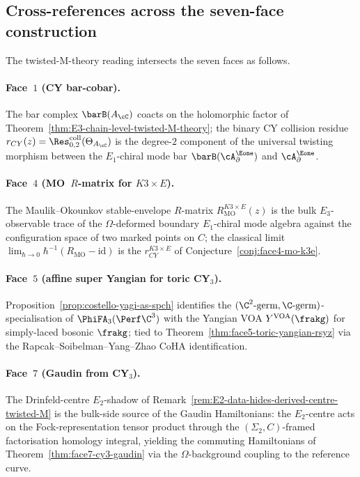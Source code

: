 \subsection{Cross-references across the seven-face construction}
\label{subsec:twisted-M-theory-seven-face-xref}

The twisted-M-theory reading intersects the seven faces as follows.

\paragraph{Face~$1$ (CY bar-cobar).} The bar complex $\barB(A_\cC)$
coacts on the holomorphic factor of
Theorem~\ref{thm:E3-chain-level-twisted-M-theory}; the binary CY
collision residue $r_{CY}(z) = \Res^{\mathrm{coll}}_{0,2}(\Theta_{A_\cC})$
is the degree-$2$ component of the universal twisting morphism between
the $E_1$-chiral mode bar $\barB(\cA^{\Eone}_\partial)$ and
$\cA^{\Eone}_\partial$.

\paragraph{Face~$4$ (MO~$R$-matrix for $K3 \times E$).} The
Maulik--Okounkov stable-envelope $R$-matrix
$R_{\mathrm{MO}}^{K3 \times E}(z)$ is the bulk $E_3$-observable
trace of the $\Omega$-deformed boundary $E_1$-chiral mode algebra
against the configuration space of two marked points on $C$; the
classical limit $\lim_{\hbar \to 0} \hbar^{-1}(R_{\mathrm{MO}} -
\mathrm{id})$ is the $r_{CY}^{K3 \times E}$ of
Conjecture~\ref{conj:face4-mo-k3e}.

\paragraph{Face~$5$ (affine super Yangian for toric CY$_3$).}
Proposition~\ref{prop:costello-yagi-as-spch} identifies the
$(\C^2\text{-germ}, \C\text{-germ})$-specialisation of
$\PhiFA_3(\Perf \C^3)$ with the Yangian VOA $Y^{\mathrm{VOA}}(\frakg)$
for simply-laced bosonic $\frakg$; tied to
Theorem~\ref{thm:face5-toric-yangian-rsyz} via the
Rapcak--Soibelman--Yang--Zhao CoHA identification.

\paragraph{Face~$7$ (Gaudin from CY$_3$).} The Drinfeld-centre
$E_2$-shadow of Remark~\ref{rem:E2-data-hides-derived-centre-twisted-M}
is the bulk-side source of the Gaudin Hamiltonians: the $E_2$-centre
acts on the Fock-representation tensor product through the
$(\Sigma_2, C)$-framed factorisation homology integral, yielding the
commuting Hamiltonians of Theorem~\ref{thm:face7-cy3-gaudin} via the
$\Omega$-background coupling to the reference curve.

